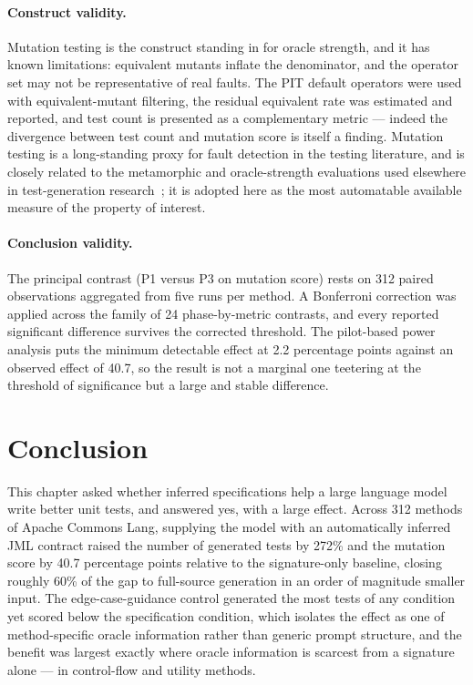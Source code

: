 \paragraph{Construct validity.} Mutation testing is the construct standing in for
oracle strength, and it has known limitations: equivalent mutants inflate the
denominator, and the operator set may not be representative of real faults. The
PIT default operators were used with equivalent-mutant filtering, the residual
equivalent rate was estimated and reported, and test count is presented as a
complementary metric --- indeed the divergence between test count and mutation
score is itself a finding. Mutation testing is a long-standing proxy for fault
detection in the testing literature, and is closely related to the
metamorphic and oracle-strength evaluations used elsewhere in test-generation
research~\citep{segura2016metamorphic,chen2018metamorphic}; it is adopted here as
the most automatable available measure of the property of interest.

\paragraph{Conclusion validity.} The principal contrast (P1 versus P3 on mutation
score) rests on 312 paired observations aggregated from five runs per method. A
Bonferroni correction was applied across the family of 24 phase-by-metric
contrasts, and every reported significant difference survives the corrected
threshold. The pilot-based power analysis puts the minimum detectable effect at
2.2 percentage points against an observed effect of 40.7, so the result is not a
marginal one teetering at the threshold of significance but a large and stable
difference.

\section{Conclusion}
\label{sec:art1:conclusion}

This chapter asked whether inferred specifications help a large language model
write better unit tests, and answered yes, with a large effect. Across 312
methods of Apache Commons Lang, supplying the model with an automatically inferred
JML contract raised the number of generated tests by 272\% and the mutation score
by 40.7 percentage points relative to the signature-only baseline, closing roughly
60\% of the gap to full-source generation in an order of magnitude smaller input.
The edge-case-guidance control generated the most tests of any condition yet
scored below the specification condition, which isolates the effect as one of
method-specific oracle information rather than generic prompt structure, and the
benefit was largest exactly where oracle information is scarcest from a signature
alone --- in control-flow and utility methods.

